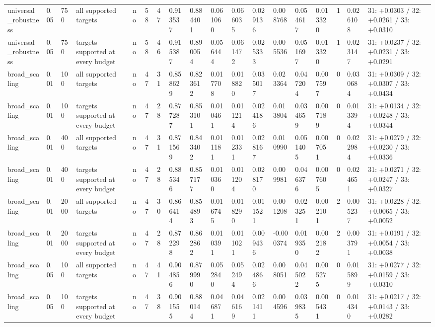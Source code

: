 \begin{tabular}{llllllllllllllllll}
universal\_robustness & 0.05 & 750 & all supported targets & no & 58 & 47 & 0.913537 & 0.884401 & 0.061060 & 0.066035 & 0.029136 & 0.008768 & 0.054617 & 0.013320 & 1 & 0.026108 & 31: +0.0303 / 32: +0.0261 / 33: +0.0310 \\
universal\_robustness & 0.05 & 750 & targets supported at every budget & no & 58 & 46 & 0.915387 & 0.890054 & 0.056444 & 0.061472 & 0.025333 & 0.005536 & 0.051697 & 0.013320 & 1 & 0.023147 & 31: +0.0237 / 32: +0.0231 / 33: +0.0291 \\
broad\_scaling & 0.01 & 100 & all supported targets & no & 47 & 31 & 0.858629 & 0.823612 & 0.017708 & 0.018820 & 0.035017 & 0.023364 & 0.047204 & 0.007597 & 0 & 0.030684 & 31: +0.0309 / 32: +0.0307 / 33: +0.0434 \\
broad\_scaling & 0.01 & 100 & targets supported at every budget & no & 47 & 28 & 0.877287 & 0.853101 & 0.010461 & 0.011214 & 0.024186 & 0.013804 & 0.034659 & 0.007189 & 0 & 0.013394 & 31: +0.0134 / 32: +0.0248 / 33: +0.0344 \\
broad\_scaling & 0.01 & 400 & all supported targets & no & 47 & 31 & 0.871569 & 0.843402 & 0.011181 & 0.012331 & 0.028167 & 0.010990 & 0.051405 & 0.007051 & 0 & 0.022984 & 31: +0.0279 / 32: +0.0230 / 33: +0.0336 \\
broad\_scaling & 0.01 & 400 & targets supported at every budget & no & 47 & 28 & 0.885346 & 0.857177 & 0.010360 & 0.011204 & 0.028170 & 0.009981 & 0.046376 & 0.007605 & 0 & 0.024651 & 31: +0.0271 / 32: +0.0247 / 33: +0.0327 \\
broad\_scaling & 0.01 & 2000 & all supported targets & no & 47 & 30 & 0.866414 & 0.854893 & 0.016745 & 0.018290 & 0.011521 & 0.001208 & 0.023251 & 0.002101 & 2 & 0.005237 & 31: +0.0228 / 32: +0.0065 / 33: +0.0052 \\
broad\_scaling & 0.01 & 2000 & targets supported at every budget & no & 47 & 28 & 0.872298 & 0.862862 & 0.010391 & 0.011021 & 0.009436 & -0.000374 & 0.019350 & 0.002182 & 2 & 0.003791 & 31: +0.0191 / 32: +0.0054 / 33: +0.0038 \\
broad\_scaling & 0.05 & 100 & all supported targets & no & 47 & 41 & 0.904856 & 0.879990 & 0.052840 & 0.052494 & 0.024866 & 0.008051 & 0.045022 & 0.005275 & 0 & 0.015899 & 31: +0.0277 / 32: +0.0159 / 33: +0.0310 \\
broad\_scaling & 0.05 & 100 & targets supported at every budget & no & 47 & 38 & 0.901555 & 0.880144 & 0.046871 & 0.046169 & 0.021411 & 0.004596 & 0.039835 & 0.005431 & 0 & 0.014340 & 31: +0.0217 / 32: +0.0143 / 33: +0.0282 \\

\end{tabular}

